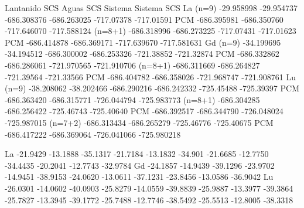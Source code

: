           Lantanido         SCS          Aguas           SCS           Sistema      Sistema SCS
La (n=9)  -29.958998      -29.954737    -686.308376      -686.263025  -717.07378    -717.01591
   PCM                                  -686.395981      -686.350760  -717.646070   -717.588124
   (n=8+1)                              -686.318996      -686.273225  -717.07431    -717.01623
   PCM                                  -686.414878      -686.369171  -717.639670   -717.581631
Gd (n=9)  -34.199695      -34.194512    -686.300002      -686.253326  -721.38852    -721.32874
   PCM                                  -686.332862      -686.286061  -721.970565   -721.910706
   (n=8+1)                              -686.311669      -686.264827  -721.39564    -721.33566
   PCM                                  -686.404782      -686.358026  -721.968747   -721.908761
Lu (n=9)  -38.208062      -38.202466    -686.290216      -686.242332  -725.45488    -725.39397
   PCM                                  -686.363420      -686.315771  -726.044794   -725.983773
   (n=8+1)                              -686.304285      -686.256422  -725.46743    -725.40640
   PCM                                  -686.392517      -686.344790  -726.048024   -725.987015
   (n=7+2)                              -686.313434      -686.265279  -725.46776    -725.40675
   PCM                                  -686.417222      -686.369064  -726.041066   -725.980218

La -21.9429 -13.1888 -35.1317 -21.7184 -13.1832 -34.901
   -21.6685 -12.7750 -34.4435 -20.2041 -12.7743 -32.9784
Gd -24.1857 -14.9439 -39.1296 -23.9702 -14.9451 -38.9153
   -24.0620 -13.0611 -37.1231 -23.8456 -13.0586 -36.9042
Lu -26.0301 -14.0602 -40.0903 -25.8279 -14.0559 -39.8839
   -25.9887 -13.3977 -39.3864 -25.7827 -13.3945 -39.1772
   -25.7488 -12.7746 -38.5492 -25.5513 -12.8005 -38.3318
